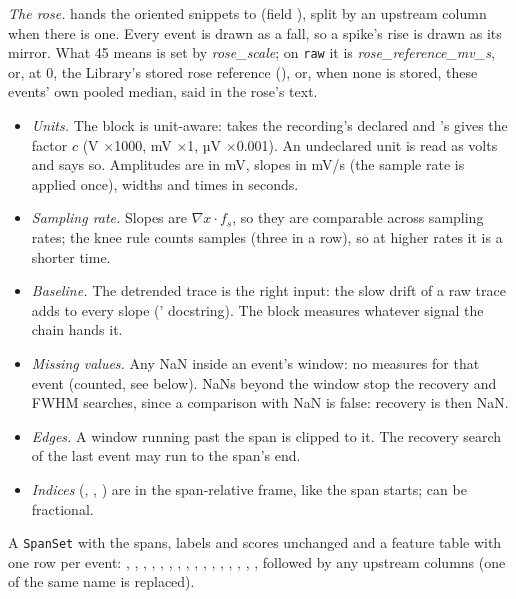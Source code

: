 \emph{The rose.}  hands the oriented snippets to 
(field ), split by an upstream  column when there is one.
Every event is drawn as a fall, so a spike's rise is drawn as its mirror. What 45\textdegree{}
means is set by \emph{rose\_scale}; on \texttt{raw} it is \emph{rose\_reference\_mv\_s}, or,
at 0, the Library's stored rose reference (), or, when
none is stored, these events' own pooled median, said in the rose's text.

\begin{itemize}
\item \emph{Units.} The block is unit-aware:  takes the recording's declared
   and 's  gives the factor $c$ (V
  $\times$1000, mV $\times$1, µV $\times$0.001). An undeclared unit is read as volts and
   says so. Amplitudes are in mV, slopes in mV/s (the sample rate is
  applied once), widths and times in seconds.
\item \emph{Sampling rate.} Slopes are $\nabla x \cdot f_s$, so they are comparable across
  sampling rates; the knee rule counts samples (three in a row), so at higher rates it is a
  shorter time.
\item \emph{Baseline.} The detrended trace is the right input: the slow drift of a raw trace
  adds to every slope (' docstring). The block measures whatever signal
  the chain hands it.
\item \emph{Missing values.} Any NaN inside an event's window: no measures for that event
  (counted, see below). NaNs beyond the window stop the recovery and FWHM searches, since a
  comparison with NaN is false: recovery is then NaN.
\item \emph{Edges.} A window running past the span is clipped to it. The recovery search of
  the last event may run to the span's end.
\item \emph{Indices} (, , ) are in
  the span-relative frame, like the span starts;  can be fractional.
\end{itemize}

A \texttt{SpanSet} with the spans, labels and scores unchanged and a feature table with one
row per event: , , , ,
, , ,
, , , ,
, , , ,
, followed by any upstream columns (one of the same name is replaced).

